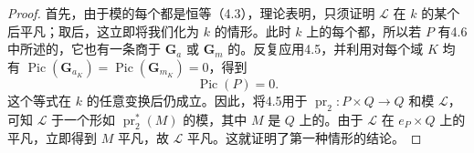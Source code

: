 \begin{proof}
首先，由于模的每个都是恒等（4.3），理论表明，只须证明 $\mathscr L$ 在 $k$ 的某个后平凡；取后，这立即将我们化为 $k$ 的情形。此时 $k$ 上的每个都，所以若 $P$ 有4.6中所述的，它也有一条商于 $\mathbf G_a$ 或 $\mathbf G_m$ 的。反复应用4.5，并利用对每个域 $K$ 均有 $\operatorname{Pic}(\mathbf G_{a_K})=\operatorname{Pic}(\mathbf G_{m_K})=0$，得到
\[\operatorname{Pic}(P)=0.\]
这个等式在 $k$ 的任意变换后仍成立。因此，将4.5用于 $\operatorname{pr}_2:P\times Q\to Q$ 和模 $\mathscr L$，可知 $\mathscr L$ 于一个形如 $\operatorname{pr}_2^*(M)$ 的模，其中 $M$ 是 $Q$ 上的。由于 $\mathscr L$ 在 $e_P\times Q$ 上的平凡，立即得到 $M$ 平凡，故 $\mathscr L$ 平凡。这就证明了第一种情形的结论。


\end{proof}
